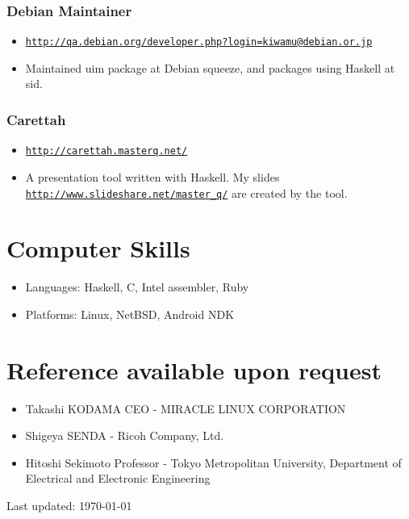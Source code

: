 \documentclass[letterpaper]{article}
\def\footer{
  \begin{center}
    \begin{footnotesize}
      Last updated: \today
    \end{footnotesize}
  \end{center}
}
\begin{document}
\subsubsection*{Debian Maintainer}
\begin{itemize}
\item \href{http://qa.debian.org/developer.php?login=kiwamu@debian.or.jp}{\tt http://qa.debian.org/developer.php?login=kiwamu@debian.or.jp}
\item Maintained uim package at Debian squeeze, and packages using Haskell at sid.
\end{itemize}

\subsubsection*{Carettah}
\begin{itemize}
\item \href{http://carettah.masterq.net/}{\tt http://carettah.masterq.net/}
\item A presentation tool written with Haskell. My slides \href{http://www.slideshare.net/master\_q/}{\tt http://www.slideshare.net/master\_q/} are created by the tool.
\end{itemize}

\section*{Computer Skills}

\begin{itemize}
  \item Languages: Haskell, C, Intel assembler, Ruby
  \item Platforms: Linux, NetBSD, Android NDK
\end{itemize}

\section*{Reference available upon request}

\begin{itemize}
  \item Takashi KODAMA CEO - MIRACLE LINUX CORPORATION
  \item Shigeya SENDA - Ricoh Company, Ltd.
  \item Hitoshi Sekimoto Professor - Tokyo Metropolitan University, Department of Electrical and Electronic Engineering
\end{itemize}

\bigskip
\footer
\end{document}
